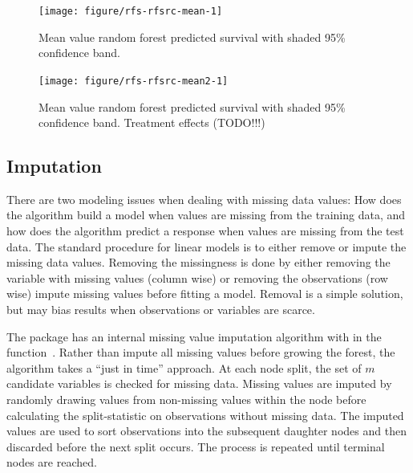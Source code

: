 \documentclass[nojss]{jss}\usepackage[]{graphicx}\usepackage[]{color}
\begin{document}
\begin{Schunk}
\begin{figure}[!htpb]

{\centering \texttt{[image: figure/rfs-rfsrc-mean-1]} 

}

\caption[Mean value random forest predicted survival with shaded 95\% confidence band]{Mean value random forest predicted survival with shaded 95\% confidence band.\label{fig:rfsrc-mean}}
\end{figure}
\end{Schunk}

\begin{Schunk}
\begin{figure}[!htpb]

{\centering \texttt{[image: figure/rfs-rfsrc-mean2-1]} 

}

\caption[Mean value random forest predicted survival with shaded 95\% confidence band]{Mean value random forest predicted survival with shaded 95\% confidence band. Treatment effects (TODO!!!)\label{fig:rfsrc-mean2}}
\end{figure}
\end{Schunk}

\subsection{Imputation}\label{S:imputation}

There are two modeling issues when dealing with missing data values: How does the algorithm build a model when values are missing from the training data, and how does the algorithm predict a response when values are missing from the test data. The standard procedure for linear models is to either remove or impute the missing data values. Removing the missingness is done by either removing the variable with missing values (column wise) or removing the observations (row wise) impute missing values before fitting a model. Removal is a simple solution, but may bias results when observations or variables are scarce. 

The  package has an internal missing value imputation algorithm with in the  function~\cite{Ishwaran:2008}. Rather than impute all missing values before growing the forest, the algorithm takes a ``just in time'' approach. At each node split, the set of $m$ candidate variables is checked for missing data. Missing values are imputed by randomly drawing values from non-missing values within the node before calculating the split-statistic on observations without missing data. The imputed values are used to sort observations into the subsequent daughter nodes and then discarded before the next split occurs. The process is repeated until terminal nodes are reached. 
\end{document}
